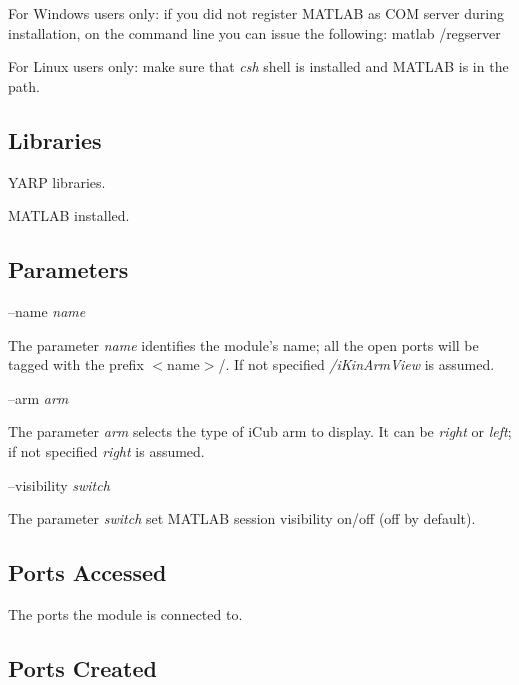 For Windows users only\+: if you did not register M\+A\+T\+L\+A\+B as C\+O\+M server during installation, on the command line you can issue the following\+: matlab /regserver

For Linux users only\+: make sure that {\itshape csh} shell is installed and M\+A\+T\+L\+A\+B is in the path.\hypertarget{group__icub__tld_lib_sec}{}\subsection{Libraries}\label{group__icub__tld_lib_sec}

\begin{DoxyItemize}
\item Y\+A\+R\+P libraries.
\item M\+A\+T\+L\+A\+B installed.
\end{DoxyItemize}\hypertarget{group__icub__tld_parameters_sec}{}\subsection{Parameters}\label{group__icub__tld_parameters_sec}
--name {\itshape name} 
\begin{DoxyItemize}
\item The parameter {\itshape name} identifies the module's name; all the open ports will be tagged with the prefix $<$name$>$/. If not specified {\itshape /i\+Kin\+Arm\+View} is assumed.
\end{DoxyItemize}

--arm {\itshape arm} 
\begin{DoxyItemize}
\item The parameter {\itshape arm} selects the type of i\+Cub arm to display. It can be {\itshape right} or {\itshape left}; if not specified {\itshape right} is assumed.
\end{DoxyItemize}

--visibility {\itshape switch} 
\begin{DoxyItemize}
\item The parameter {\itshape switch} set M\+A\+T\+L\+A\+B session visibility on/off (off by default).
\end{DoxyItemize}\hypertarget{group__signalScope_portsa_sec}{}\subsection{Ports Accessed}\label{group__signalScope_portsa_sec}
The ports the module is connected to.\hypertarget{group__icub__tld_portsc_sec}{}\subsection{Ports Created}\label{group__icub__tld_portsc_sec}

